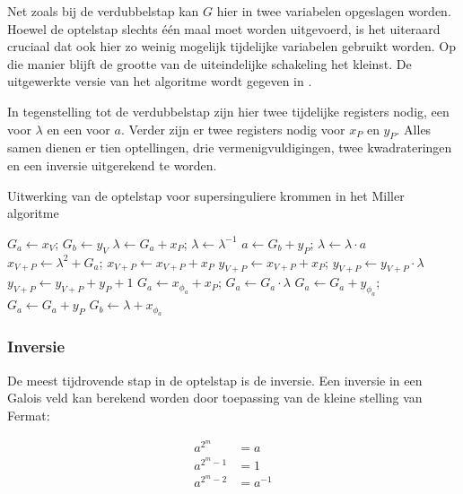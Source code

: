 Net zoals bij de verdubbelstap kan $G$ hier in twee variabelen opgeslagen worden. Hoewel de optelstap slechts \'e\'en maal moet worden uitgevoerd, is het uiteraard cruciaal dat ook hier zo weinig mogelijk tijdelijke variabelen gebruikt worden. Op die manier blijft de grootte van de uiteindelijke schakeling het kleinst. De uitgewerkte versie van het algoritme wordt gegeven in .

In tegenstelling tot de verdubbelstap zijn hier twee tijdelijke registers nodig, een voor $\lambda$ en een voor $a$. Verder zijn er twee registers nodig voor $x_P$ en $y_P$. Alles samen dienen er tien optellingen, drie vermenigvuldigingen, twee kwadrateringen en een inversie uitgerekend te worden.

\begin{algorithm}[h]
	\caption{Uitwerking van de optelstap voor supersinguliere krommen in het Miller algoritme}
	\label{algoritme-implementatie-miller-add-detail}
	$G_a \gets x_V$; $G_b \gets y_V$\;
	$\lambda \gets G_a + x_P$; $\lambda \gets \lambda^{-1}$\;
	$a \gets G_b + y_P$; $\lambda \gets \lambda \cdot a$\;
	$x_{V + P} \gets \lambda ^2 + G_a$; $x_{V + P} \gets x_{V + P} + x_P$\;
	$y_{V + P} \gets x_{V + P} + x_P$; $y_{V + P} \gets y_{V + P} \cdot \lambda$\;
	$y_{V + P} \gets y_{V + P} + y_P + 1$\;
	$G_a \gets x_{\phi_a} + x_P$; $G_a \gets G_a \cdot \lambda$\;
	$G_a \gets G_a + y_{\phi_a}$; $G_a \gets G_a + y_P$\;
	$G_b \gets \lambda + x_{\phi_a}$\;
\end{algorithm}

\subsubsection{Inversie}

De meest tijdrovende stap in de optelstap is de inversie.  Een inversie in een Galois veld kan berekend worden door toepassing van de kleine stelling van Fermat:

\[\begin{aligned}
a^{2^m}		&= a\\
a^{2^m - 1}	&= 1\\
a^{2^m - 2}	&= a^{-1}\\
\end{aligned}\]

